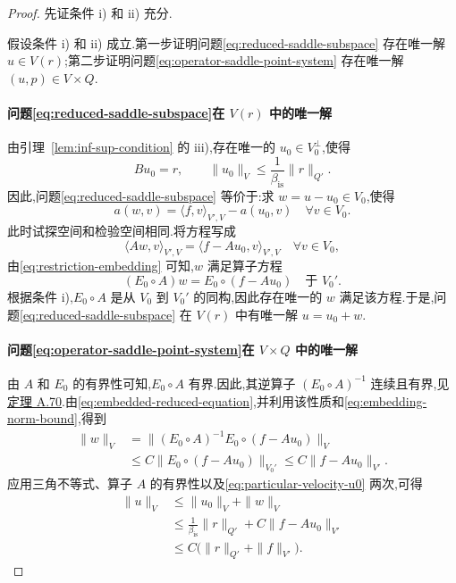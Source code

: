 \begin{proof}
先证条件 i) 和 ii) 充分.

假设条件 i) 和 ii) 成立.第一步证明问题\cref{eq:reduced-saddle-subspace} 存在唯一解 $u\in V(r)$;第二步证明问题\cref{eq:operator-saddle-point-system} 存在唯一解 $(u,p)\in V\times Q$.

\paragraph{问题\cref{eq:reduced-saddle-subspace}在 $V(r)$ 中的唯一解}
由引理~\ref{lem:inf-sup-condition} 的 iii),存在唯一的 $u_0\in V_0^{\perp}$,使得
\begin{equation}\label{eq:particular-velocity-u0}
  Bu_0=r,\qquad
  \|u_0\|_V\le\frac{1}{\beta_{\mathrm{is}}}\|r\|_{Q'}.
\end{equation}
因此,问题\cref{eq:reduced-saddle-subspace} 等价于:求 $w=u-u_0\in V_0$,使得
\[
  a(w,v)=\langle f,v\rangle_{V',V}-a(u_0,v)
  \quad\forall v\in V_0.
\]
此时试探空间和检验空间相同.将方程写成
\begin{equation}\label{eq:reduced-operator-equation}
  \langle Aw,v\rangle_{V',V}
    =\langle f-Au_0,v\rangle_{V',V}
  \quad\forall v\in V_0,
\end{equation}
由\cref{eq:restriction-embedding} 可知,$w$ 满足算子方程
\begin{equation}\label{eq:embedded-reduced-equation}
  (E_0\circ A)w=E_0\circ(f-Au_0)\quad\text{于 }V_0'.
\end{equation}
根据条件 i),$E_0\circ A$ 是从 $V_0$ 到 $V_0'$ 的同构,因此存在唯一的 $w$ 满足该方程.于是,问题\cref{eq:reduced-saddle-subspace} 在 $V(r)$ 中有唯一解 $u=u_0+w$.

\paragraph{问题\cref{eq:operator-saddle-point-system}在 $V\times Q$ 中的唯一解}
由 $A$ 和 $E_0$ 的有界性可知,$E_0\circ A$ 有界.因此,其逆算子 $(E_0\circ A)^{-1}$ 连续且有界,见\hyperref[thm:appendix-a-70]{定理 A.70}.由\cref{eq:embedded-reduced-equation},并利用该性质和\cref{eq:embedding-norm-bound},得到
\[
\begin{aligned}
  \|w\|_V
    &=\|(E_0\circ A)^{-1}E_0\circ(f-Au_0)\|_V\\
    &\le C\|E_0\circ(f-Au_0)\|_{V_0'}
     \le C\|f-Au_0\|_{V'}.
\end{aligned}
\]
应用三角不等式、算子 $A$ 的有界性以及\cref{eq:particular-velocity-u0} 两次,可得
\begin{equation}\label{eq:velocity-stability-bound}
\begin{aligned}
  \|u\|_V
    &\le\|u_0\|_V+\|w\|_V\\
    &\le\frac{1}{\beta_{\mathrm{is}}}\|r\|_{Q'}
       +C\|f-Au_0\|_{V'}\\
    &\le C\bigl(\|r\|_{Q'}+\|f\|_{V'}\bigr).
\end{aligned}
\end{equation}


\end{proof}
